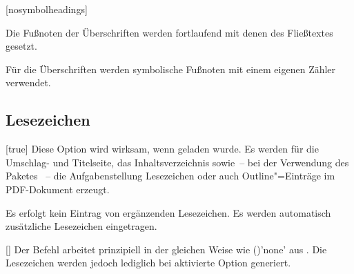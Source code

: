 \begin{Declaration*}{}
\begin{Declaration*}{}
\begin{Declaration*}{}
\begin{Declaration}{}[nosymbolheadings]
\begin{Declaration}[v2.02]{}
%
\begin{values}{}
\item[nosymbolheadings/numberheadings]
  Die Fußnoten der Überschriften werden fortlaufend mit denen des Fließtextes 
  gesetzt.
\item[symbolheadings]
  Für die Überschriften werden symbolische Fußnoten mit einem eigenen Zähler 
  verwendet.
\end{values}
\end{Declaration}
\end{Declaration}


\subsection{Lesezeichen}
%
%
\begin{Declaration}{}[true]%
\printdeclarationlist%
%
%
%
%
%
%
%
Diese Option wird wirksam, wenn  geladen wurde. Es werden für 
die Umschlag- und Titelseite, das Inhaltsverzeichnis sowie~-- bei der 
Verwendung des Paketes ~-- die Aufgabenstellung 
Lesezeichen oder auch Outline"=Einträge im PDF-Dokument erzeugt.
%
\begin{values}{}
\itemfalse
  Es erfolgt kein Eintrag von ergänzenden Lesezeichen.
\itemtrue*
  Es werden automatisch zusätzliche Lesezeichen eingetragen.
\end{values}
\end{Declaration}

\begin{Declaration}{%
  []%
}%
\printdeclarationlist%
%
Der Befehl  arbeitet prinzipiell in der gleichen Weise wie 
()'none' aus . Die 
Lesezeichen werden jedoch lediglich bei aktivierte Option  
generiert.
\end{Declaration}




\end{Declaration*}
\end{Declaration*}
\end{Declaration*}
